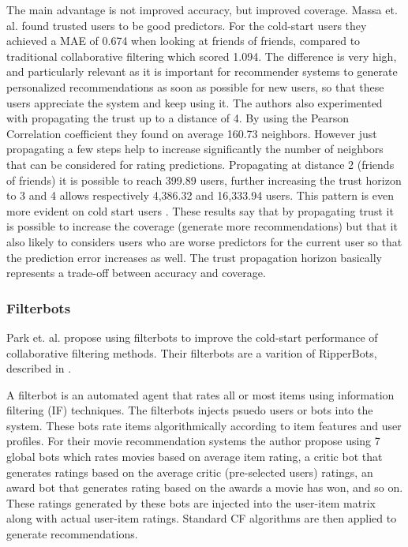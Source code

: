 The main advantage is not improved accuracy, but improved coverage. Massa et. al. \cite{Massa2007} found trusted users to be good predictors. For the cold-start users they achieved a MAE of 0.674 when looking at friends of friends, compared to traditional collaborative filtering which scored 1.094. The difference is very high, and particularly relevant as it is important for recommender systems to generate personalized recommendations as soon as possible for new users, so that these users appreciate the system and keep using it. The authors also experimented with
propagating the trust up to a distance of 4. By using the Pearson Correlation
coefficient they found on average 160.73 neighbors. However just propagating a
few steps help to increase significantly the number of neighbors that can be
considered for rating predictions. Propagating at distance 2 (friends of
friends) it is possible to reach 399.89 users, further increasing the trust
horizon to 3 and 4 allows respectively 4,386.32 and 16,333.94 users. This
pattern is even more evident on cold start users \cite{Massa2004}. These
results say that by propagating trust it is possible to increase the coverage
(generate more recommendations) but that it also likely to considers users who are worse
predictors for the current user so that the prediction error increases as well.
The trust propagation horizon basically represents a trade-off between accuracy
and coverage.


\subsubsection{Filterbots}


Park et. al. \cite{Park2006} propose using filterbots to improve the cold-start
performance of collaborative filtering methods. Their filterbots are a varition of RipperBots, described in \cite{Good1999}.

A filterbot is an automated agent that rates all or most items using information filtering (IF) techniques. The filterbots injects psuedo
users or bots into the system. These bots rate items algorithmically according to item features and user profiles. For their movie recommendation systems the author propose using 7 global bots which rates movies based on average item rating, a critic bot that generates ratings based on the average critic (pre-selected users) ratings, an award bot that generates rating based on the awards a movie has won, and so on. These ratings generated by these bots are injected into the user-item matrix along with actual user-item ratings. Standard CF algorithms are then applied to generate
recommendations. 

